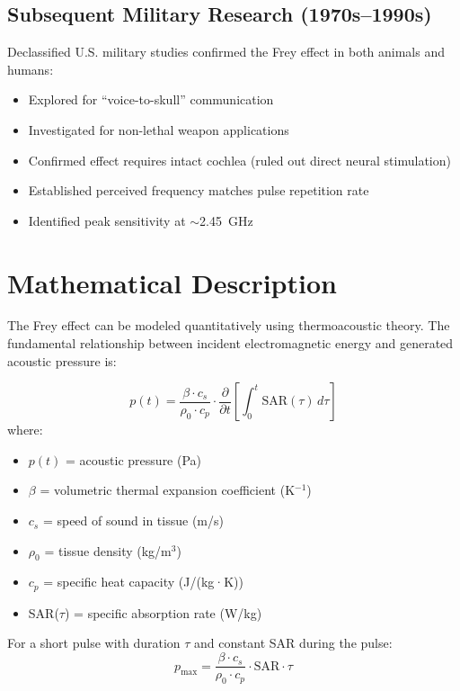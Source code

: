 \subsection{Subsequent Military Research (1970s--1990s)}

Declassified U.S. military studies confirmed the Frey effect in both animals and humans:
\begin{itemize}
\item Explored for ``voice-to-skull'' communication
\item Investigated for non-lethal weapon applications
\item Confirmed effect requires intact cochlea (ruled out direct neural stimulation)
\item Established perceived frequency matches pulse repetition rate
\item Identified peak sensitivity at $\sim$2.45~GHz
\end{itemize}

\section{Mathematical Description}

The Frey effect can be modeled quantitatively using thermoacoustic theory. The fundamental relationship between incident electromagnetic energy and generated acoustic pressure is:

\begin{equation}
p(t) = \frac{\beta \cdot c_s}{\rho_0 \cdot c_p} \cdot \frac{\partial}{\partial t}\left[\int_0^t \text{SAR}(\tau) \, d\tau\right]
\end{equation}
where:
\begin{itemize}
\item $p(t)$ = acoustic pressure (Pa)
\item $\beta$ = volumetric thermal expansion coefficient (K$^{-1}$)
\item $c_s$ = speed of sound in tissue (m/s)
\item $\rho_0$ = tissue density (kg/m$^3$)
\item $c_p$ = specific heat capacity (J/(kg·K))
\item SAR($\tau$) = specific absorption rate (W/kg)
\end{itemize}

For a short pulse with duration $\tau$ and constant SAR during the pulse:
\begin{equation}
p_{\text{max}} = \frac{\beta \cdot c_s}{\rho_0 \cdot c_p} \cdot \text{SAR} \cdot \tau
\end{equation}

